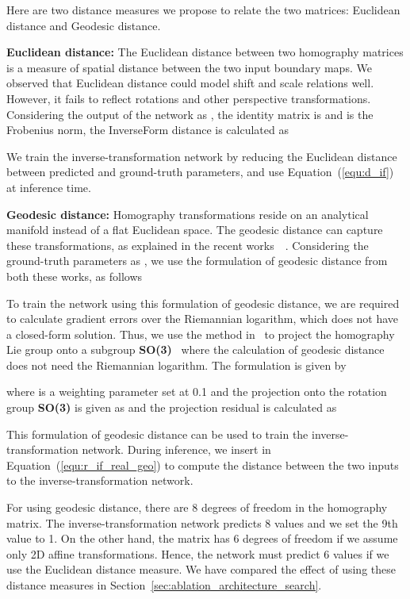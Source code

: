 \documentclass[final]{cvpr}
\begin{document}
Here are two distance measures we propose to relate the two matrices: Euclidean distance and Geodesic distance. 

\textbf{Euclidean distance:} The Euclidean distance between two homography matrices is a measure of spatial distance between the two input boundary maps. We observed that Euclidean distance could model shift and scale relations well. However, it fails to reflect rotations and other perspective transformations. Considering the output of the network as , the  identity matrix is  and  is the Frobenius norm, the InverseForm distance is calculated as


We train the inverse-transformation network by reducing the Euclidean distance between predicted and ground-truth parameters, and use Equation~(\ref{equ:d_if}) at inference time.

\textbf{Geodesic distance:} Homography transformations reside on an analytical manifold instead of a flat Euclidean space. The geodesic distance can capture these transformations, as explained in the recent works~\cite{aetv2}~\cite{liegroups}. Considering the ground-truth parameters as , we use the formulation of geodesic distance from both these works, as follows 

To train the network using this formulation of geodesic distance, we are required to calculate gradient errors over the Riemannian logarithm, which does not have a closed-form solution. Thus, we use the method in~\cite{aetv2} to project the homography Lie group onto a subgroup \textbf{SO(3)}~\cite{taylor1994minimization} where the calculation of geodesic distance does not need the Riemannian logarithm. The formulation is given by

where  is a weighting parameter set at 0.1 and the projection  onto the rotation group \textbf{SO(3)} is given as 
 and the projection residual  is calculated as

This formulation of geodesic distance can be used to train the inverse-transformation network. During inference, we insert  in Equation~(\ref{equ:r_if_real_geo}) to compute the distance between the two inputs to the inverse-transformation network.

For using geodesic distance, there are 8 degrees of freedom in the  homography matrix. The inverse-transformation network predicts 8 values and we set the 9th value to 1. 
On the other hand, the matrix has 6 degrees of freedom if we assume only 2D affine transformations. Hence, the network must predict 6 values if we use the Euclidean distance measure. We have compared the effect of using these distance measures in Section~\ref{sec:ablation_architecture_search}.
\end{document}
